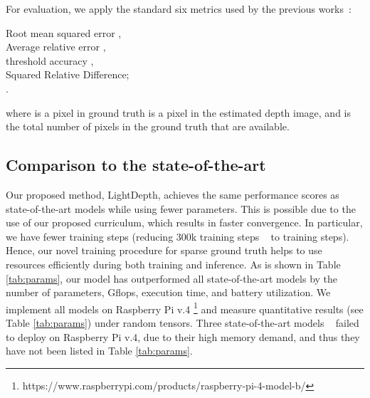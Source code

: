 \documentclass{article}
\begin{document}
For evaluation, we apply the standard six metrics used by the previous works~\cite{eigen}:

Root mean squared error , \\
Average relative error , \\ threshold accuracy ,\\ Squared Relative Difference; \\.

where  is a pixel in ground truth  is a pixel in the estimated depth image, and  is the total number of pixels in the ground truth that are
available.

\subsection{Comparison to the state-of-the-art}
Our proposed method, LightDepth, achieves the same performance scores as state-of-the-art models while using fewer parameters. This is possible due to the use of our proposed curriculum, which results in faster convergence. In particular, we have fewer training steps (reducing 300k training steps ~\cite{alhashim2018high} to  training steps). Hence, our novel training procedure for sparse ground truth helps to use resources efficiently during both training and inference. As is shown in Table \ref{tab:params}, our model has outperformed all  state-of-the-art models by the number of parameters, Gflops,  execution time, and battery utilization.  We implement all models on Raspberry Pi v.4 \footnote{https://www.raspberrypi.com/products/raspberry-pi-4-model-b/}  and measure quantitative results (see Table \ref{tab:params}) under random tensors. Three state-of-the-art models ~\cite{adabins,1binsformer,3depthformer} failed to deploy on Raspberry Pi v.4, due to their high memory demand, and thus they have not been listed in Table \ref{tab:params}.
\end{document}
